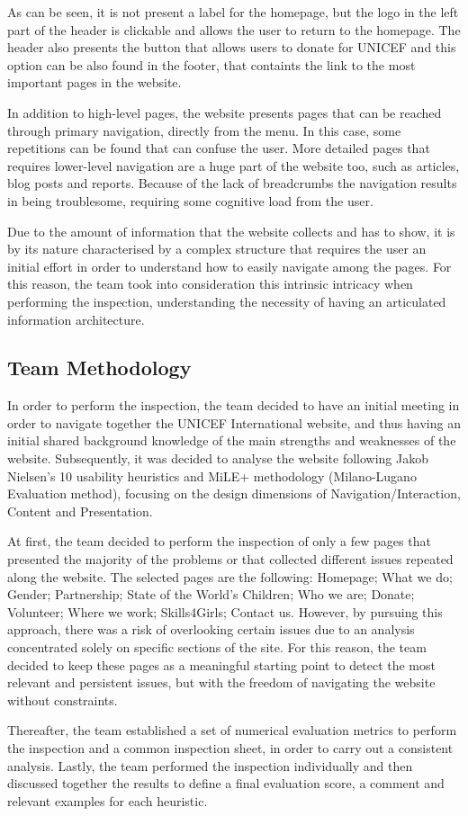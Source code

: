 As can be seen, it is not present a label for the homepage, but the logo in the left part of the header is clickable and allows the user to return to the homepage. The header also presents the button that allows users to donate for UNICEF and this option can be also found in the footer, that containts the link to the most important pages in the website.

In addition to high-level pages, the website presents pages that can be reached through primary navigation, directly from the menu. In this case, some repetitions can be found that can confuse the user.
More detailed pages that requires lower-level navigation are a huge part of the website too, such as articles, blog posts and reports. Because of the lack of breadcrumbs the navigation results in being troublesome, requiring some cognitive load from the user.

Due to the amount of information that the website collects and has to show, it is by its nature characterised by a complex structure that requires the user an initial effort in order to understand how to easily navigate among the pages. For this reason, the team took into consideration this intrinsic intricacy when performing the inspection, understanding the necessity of having an articulated information architecture.
\clearpage

\subsection{Team Methodology}
In order to perform the inspection, the team decided to have an initial meeting in order to navigate together the UNICEF International website, and thus having an initial shared background knowledge of the main strengths and weaknesses of the website. 
Subsequently, it was decided to analyse the website following Jakob Nielsen's 10 usability heuristics and MiLE+ methodology (Milano-Lugano Evaluation method), focusing on the design dimensions of Navigation/Interaction, Content and Presentation.

At first, the team decided to perform the inspection of only a few pages that presented the majority of the problems or that collected different issues repeated along the website. The selected pages are the following: Homepage; What we do; Gender; Partnership; State of the World’s Children; Who we are; Donate; Volunteer; Where we work; Skills4Girls; Contact us.
However, by pursuing this approach, there was a risk of overlooking certain issues due to an analysis concentrated solely on specific sections of the site. For this reason, the team decided to keep these pages as a meaningful starting point to detect the most relevant and persistent issues, but with the freedom of navigating the website without constraints.

Thereafter, the team established a set of numerical evaluation metrics to perform the inspection and a common inspection sheet, in order to carry out a consistent analysis.
Lastly, the team performed the inspection individually and then discussed together the results to define a final evaluation score, a comment and relevant examples for each heuristic.
\clearpage